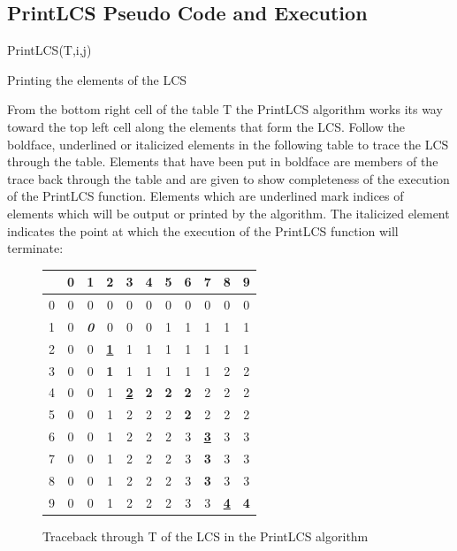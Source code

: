 \documentclass[12pt,letterpaper]{article}
\begin{document}
\subsection{PrintLCS Pseudo Code and Execution}
\begin{algorithm}[h]
PrintLCS(T,i,j)\Begin{
	\If{ i>0 and j>0 }{
		\If{x[i]==y[j]}{
			PrintLCS(T, i-1,j-1)\\
			Print(x[i])
		}
		\Else{
			\If{$T[i-1,j] \geq T[i,j-1] $}{
				PrintLCS(T,i-1,j]
			}
			\Else{
				PrintLCS(T,i,j-1)
			}
		}
	}
}
\caption{Printing the elements of the LCS}
\label{PrintLCS}
\end{algorithm}
From the bottom right cell of the table T the PrintLCS algorithm works its way toward the top left cell along the elements that form the LCS. Follow the boldface, underlined or italicized elements in the following table to trace the LCS through the table. Elements that have been put in boldface are members of the trace back through the table and are given to show completeness of the execution of the PrintLCS function. Elements which are underlined mark indices of elements which will be output or printed by the algorithm. The italicized element indicates the point at which the execution of the PrintLCS function will terminate:
\begin{figure}[h]
\centering
\begin{tabular}{|c|c|c|c|c|c|c|c|c|c|c|}
\hline
  &0&1&2&3&4&5&6&7&8&9\\ \hline \hline
 0&0&0&0&0&0&0&0&0&0&0\\ \hline
 1&0&\textbf{\textit{0}}&0&0&0&1&1&1&1&1\\ \hline
 2&0&0&\textbf{\underline{1}}&1&1&1&1&1&1&1\\ \hline
 3&0&0&\textbf{1}&1&1&1&1&1&2&2\\ \hline
 4&0&0&1&\textbf{\underline{2}}&\textbf{2}&\textbf{2}&\textbf{2}&2&2&2\\ \hline
 5&0&0&1&2&2&2&\textbf{2}&2&2&2\\ \hline
 6&0&0&1&2&2&2&3&\textbf{\underline{3}}&3&3\\ \hline
 7&0&0&1&2&2&2&3&\textbf{3}&3&3\\ \hline
 8&0&0&1&2&2&2&3&\textbf{3}&3&3\\ \hline
 9&0&0&1&2&2&2&3&3&\textbf{\underline{4}}&\textbf{4}\\ \hline
\end{tabular}
\caption{Traceback through T of the LCS in the PrintLCS algorithm}
\end{figure}
\FloatBarrier
\end{document}

